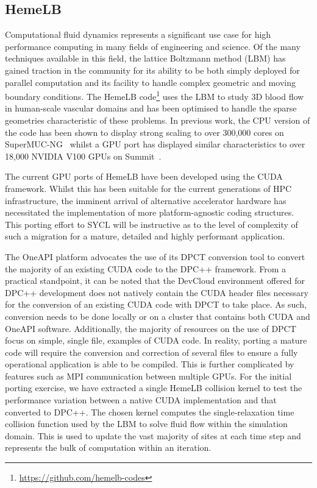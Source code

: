 \documentclass[../main]{subfiles}
\begin{document}
\subsection{HemeLB}\label{sec:hemelb}

Computational fluid dynamics represents a significant use case for high performance computing in many fields of engineering and science.
Of the many techniques available in this field, the lattice Boltzmann method (LBM) has gained traction in the community for its ability to be both simply deployed for parallel computation and its facility to handle complex geometric and moving boundary conditions.
The HemeLB code\footnote{\url{https://github.com/hemelb-codes}} uses the LBM to study 3D blood flow in human-scale vascular domains and has been optimised to handle the sparse geometries characteristic of these problems.
In previous work, the CPU version of the code has been shown to display strong scaling to over 300,000 cores on SuperMUC-NG~\cite{mccullough2021towards} whilst a GPU port has displayed similar characteristics to over 18,000 NVIDIA V100 GPUs on Summit~\cite{zacharoudiou_development_2022}.

The current GPU ports of HemeLB have been developed using the CUDA framework.
Whilst this has been suitable for the current generations of HPC infrastructure, the imminent arrival of alternative accelerator hardware has necessitated the implementation of more platform-agnostic coding structures.
This porting effort to SYCL will be instructive as to the level of complexity of such a migration for a mature, detailed and highly performant application.

The OneAPI platform advocates the use of its DPCT conversion tool to convert the majority of an existing CUDA code to the DPC++ framework.
From a practical standpoint, it can be noted that the DevCloud environment offered for DPC++ development does not natively contain the CUDA header files necessary for the conversion of an existing CUDA code with DPCT to take place.
As such, conversion needs to be done locally or on a cluster that contains both CUDA and OneAPI software.
Additionally, the majority of resources on the use of DPCT focus on simple, single file, examples of CUDA code.
In reality, porting a mature code will require the conversion and correction of several files to ensure a fully operational application is able to be compiled.
This is further complicated by features such as MPI communication between multiple GPUs.
For the initial porting exercise, we have extracted a single HemeLB collision kernel to test the performance variation between a native CUDA implementation and that converted to DPC++.
The chosen kernel computes the single-relaxation time collision function used by the LBM to solve fluid flow within the simulation domain.
This is used to update the vast majority of sites at each time step and represents the bulk of computation within an iteration.
\end{document}
